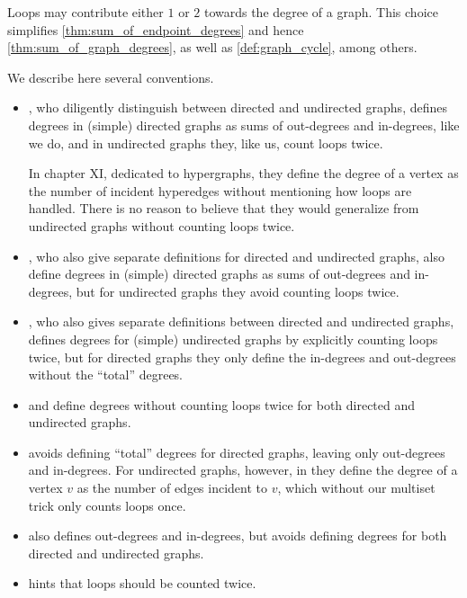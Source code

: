 \begin{remark}\label{rem:counting_loops_twice}
  Loops may contribute either \( 1 \) or \( 2 \) towards the degree of a graph. This choice simplifies \cref{thm:sum_of_endpoint_degrees} and hence \cref{thm:sum_of_graph_degrees}, as well as \cref{def:graph_cycle}, among others.

  We describe here several conventions.
  \begin{itemize}
    \item \Textcite[27]{ЕмеличевИПр1990ТеорияГрафов}, who diligently distinguish between directed and undirected graphs, defines degrees in (simple) directed graphs as sums of out-degrees and in-degrees, like we do, and in undirected graphs they, like us, count loops twice.

    In chapter XI, dedicated to hypergraphs, they define the degree of a vertex as the number of incident hyperedges without mentioning how loops are handled. There is no reason to believe that they would generalize from undirected graphs without counting loops twice.

    \item \Textcite[277]{БелоусовТкачёв2004ДискретнаяМатематика}, who also give separate definitions for directed and undirected graphs, also define degrees in (simple) directed graphs as sums of out-degrees and in-degrees, but for undirected graphs they avoid counting loops twice.

    \item \Textcite[def. 10.2.3]{Rosen2019DiscreteMathematics}, who also gives separate definitions between directed and undirected graphs, defines degrees for (simple) undirected graphs by explicitly counting loops twice, but for directed graphs they only define the in-degrees and out-degrees without the \enquote{total} degrees.

    \item \Textcite[191]{Erickson2019Algorithms} and \textcite[8]{Мирчев2001Графи} define degrees without counting loops twice for both directed and undirected graphs.

    \item \Textcite[def. 1.1.7]{Knauer2019AlgebraicGraphTheory} avoids defining \enquote{total} degrees for directed graphs, leaving only out-degrees and in-degrees. For undirected graphs, however, in \cite[def. 1.1.8]{Knauer2019AlgebraicGraphTheory} they define the degree of a vertex \( v \) as the number of edges incident to \( v \), which without our multiset trick only counts loops once.

    \item \Textcite[372]{Knuth1997ArtVol1} also defines out-degrees and in-degrees, but avoids defining degrees for both directed and undirected graphs.

    \item \Textcite[8]{Bollobás1998ModernGraphTheory} hints that loops should be counted twice.
  \end{itemize}
\end{remark}

